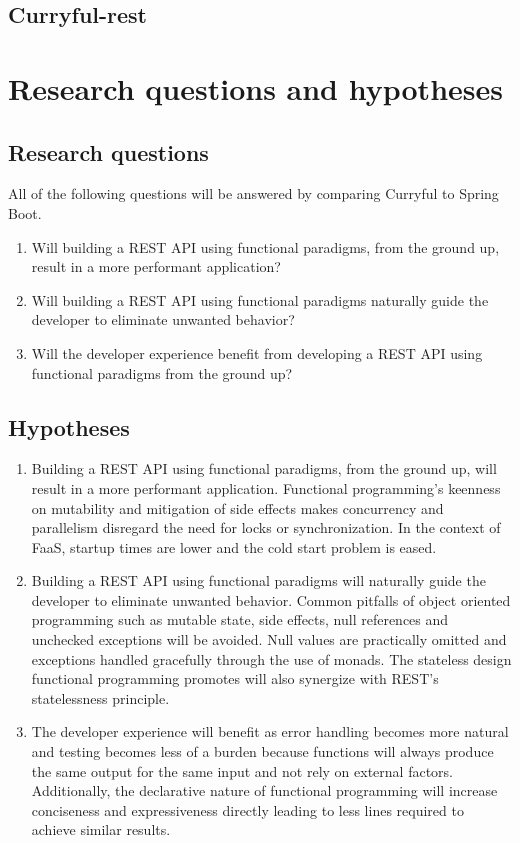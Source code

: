 \documentclass[a4paper]{article}
\begin{document}
\subsection{Curryful-rest}

\section{Research questions and hypotheses}
\subsection{Research questions}

All of the following questions will be answered by comparing Curryful to Spring
Boot.

\begin{enumerate}
	\item Will building a REST API using functional paradigms, from the
			ground up, result in a more performant application?
	\item Will building a REST API using functional paradigms naturally
			guide the developer to eliminate unwanted behavior?
	\item Will the developer experience benefit from developing a REST API using
			functional paradigms from the ground up?
\end{enumerate}

\subsection{Hypotheses}

\begin{enumerate}
	\item Building a REST API using functional paradigms, from the ground
			up, will result in a more performant application. Functional
			programming's keenness on mutability and mitigation of side effects
			makes concurrency and parallelism disregard the need for locks or
			synchronization. In the context of FaaS, startup times are lower
			and the cold start problem is eased.
	\item Building a REST API using functional paradigms will naturally guide
			the developer to eliminate unwanted behavior. Common pitfalls of
			object oriented programming such as mutable state, side effects,
			null references and unchecked exceptions will be avoided. Null
			values are practically omitted and exceptions handled gracefully
			through the use of monads. The stateless design functional
			programming promotes will also synergize with REST's statelessness
			principle.
	\item The developer experience will benefit as error handling becomes more
			natural and testing becomes less of a burden because functions will
			always produce the same output for the same input and not rely on
			external factors. Additionally, the declarative nature of functional
			programming will increase conciseness and expressiveness directly
			leading to less lines required to achieve similar results.
\end{enumerate}
\end{document}
